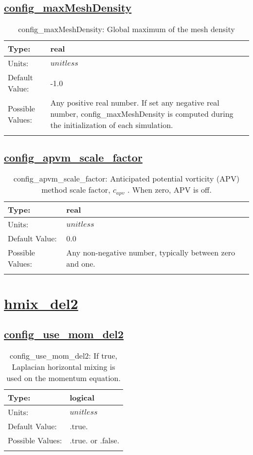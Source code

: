 \subsection[config\_maxMeshDensity]{\hyperref[sec:nm_tab_hmix]{config\_maxMeshDensity}}
\label{subsec:nm_sec_config_maxMeshDensity}
\begin{center}
\begin{longtable}{| p{2.0in} | p{4.0in} |}
    \hline
    Type: & real \\
    \hline
    Units: & $unitless$ \\
    \hline
    Default Value: & -1.0 \\
    \hline
    Possible Values: & Any positive real number. If set any negative real number, config\_maxMeshDensity is computed during the initialization of each simulation. \\
    \hline
    \caption{config\_maxMeshDensity: Global maximum of the mesh density}
\end{longtable}
\end{center}
\subsection[config\_apvm\_scale\_factor]{\hyperref[sec:nm_tab_hmix]{config\_apvm\_scale\_factor}}
\label{subsec:nm_sec_config_apvm_scale_factor}
\begin{center}
\begin{longtable}{| p{2.0in} | p{4.0in} |}
    \hline
    Type: & real \\
    \hline
    Units: & $unitless$ \\
    \hline
    Default Value: & 0.0 \\
    \hline
    Possible Values: & Any non-negative number, typically between zero and one. \\
    \hline
    \caption{config\_apvm\_scale\_factor:  Anticipated potential vorticity (APV) method scale factor,  $c_{apv}$ .  When zero, APV is off.}
\end{longtable}
\end{center}
\section[hmix\_del2]{\hyperref[sec:nm_tab_hmix_del2]{hmix\_del2}}
\label{sec:nm_sec_hmix_del2}
\subsection[config\_use\_mom\_del2]{\hyperref[sec:nm_tab_hmix_del2]{config\_use\_mom\_del2}}
\label{subsec:nm_sec_config_use_mom_del2}
\begin{center}
\begin{longtable}{| p{2.0in} | p{4.0in} |}
    \hline
    Type: & logical \\
    \hline
    Units: & $unitless$ \\
    \hline
    Default Value: & .true. \\
    \hline
    Possible Values: & .true. or .false. \\
    \hline
    \caption{config\_use\_mom\_del2: If true, Laplacian horizontal mixing is used on the momentum equation.}
\end{longtable}
\end{center}
